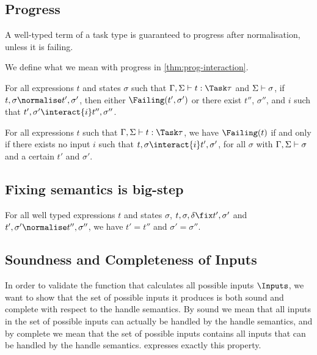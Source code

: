 \subsection{Progress}

A well-typed term of a task type is guaranteed to progress after normalisation,
unless it is failing.

We define what we mean with progress in \cref{thm:prog-interaction}.
\begin{theorem}
  For all expressions $t$ and states $\sigma$
  such that $\Gamma,\Sigma \infers t:\Task\tau$ and $\Sigma \vdash \sigma$,
  if $t,\sigma \normalise t',\sigma'$,
  then either $\Failing(t', \sigma')$
  or there exist $t''$, $\sigma''$, and $i$ such that $t',\sigma'\interact{i} t'',\sigma''$.
  \label{thm:prog-interaction}
\end{theorem}



\begin{lemma}
  For all expressions $t$
  such that $\Gamma,\Sigma\infers t:\Task\tau$,
  we have $\Failing(t)$ if and only if there exists no input $i$ such that $t,\sigma\interact{i} t',\sigma'$, for all $\sigma$ with $\Gamma,\Sigma\vdash\sigma$ and a certain $t'$ and $\sigma'$.
  \label{lem:failing}
\end{lemma}

\subsection{Fixing semantics is big-step}

\begin{lemma}
    For all well typed expressions $t$ and states $\sigma$,
    $t,\sigma,\delta\fix t',\sigma'$ and $t',\sigma'\normalise t'',\sigma''$,
    we have $t'=t''$ and $\sigma'=\sigma''$.
\end{lemma}

\subsection{Soundness and Completeness of Inputs}

In order to validate the function that calculates all possible inputs $\Inputs$,
we want to show that the set of possible inputs it produces is both sound and complete with respect to the handle semantics.
By sound we mean that all inputs in the set of possible inputs can actually be handled by the handle semantics,
and by complete we mean that the set of possible inputs contains all inputs that can be handled by the handle semantics.
 expresses exactly this property.


